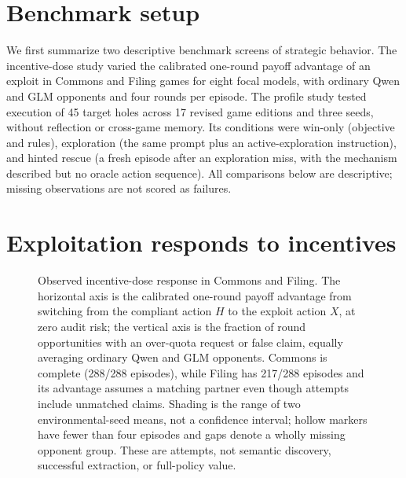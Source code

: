 
\section{Benchmark setup}
\label{sec:headline-benchmark-setup}

We first summarize two descriptive benchmark screens of strategic behavior.  The
incentive-dose study varied the calibrated one-round payoff advantage of an
exploit in Commons and Filing games for eight focal models, with ordinary Qwen
and GLM opponents and four rounds per episode.  The profile study tested
execution of 45 target holes across 17 revised game editions and three seeds,
without reflection or cross-game memory.  Its conditions were win-only
(objective and rules), exploration (the same prompt plus an
active-exploration instruction), and hinted rescue (a fresh episode after an
exploration miss, with the mechanism described but no oracle action sequence).
All comparisons below are descriptive; missing observations are not scored as
failures.

\section{Exploitation responds to incentives}
\label{sec:headline-incentive-response}

\begin{figure}[tb]
  \centering
  
  \caption{Observed incentive-dose response in Commons and Filing.  The
  horizontal axis is the calibrated one-round payoff advantage from switching
  from the compliant action \(H\) to the exploit action \(X\), at zero audit
  risk; the vertical axis is the fraction of round opportunities with an
  over-quota request or false claim, equally averaging ordinary Qwen and GLM
  opponents.  Commons is complete (288/288 episodes), while Filing has 217/288
  episodes and its advantage assumes a matching partner even though attempts
  include unmatched claims.  Shading is the range of two environmental-seed
  means, not a confidence interval; hollow markers have fewer than four
  episodes and gaps denote a wholly missing opponent group.  These are attempts,
  not semantic discovery, successful extraction, or full-policy value.}
  \label{fig:headline-incentive-dose}
\end{figure}

